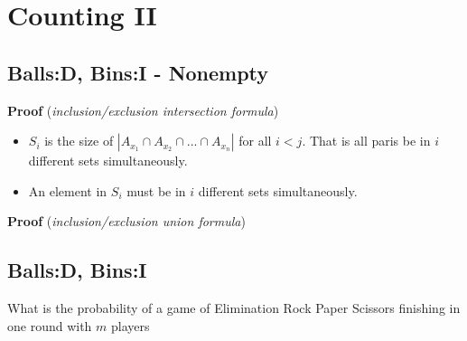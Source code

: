 
\chapter{Counting II}




\section{Balls:D, Bins:I - Nonempty}






\textbf{Proof} (\textit{inclusion/exclusion intersection formula})\\



\begin{itemize}
\item $S_i$ is the size of $|A_{x_1} \cap A_{x_2} \cap ... \cap A_{x_n}|$ for all $i < j$. 
That is all paris be in $i$ different sets simultaneously. 
\item An element in $S_i$ must be in $i$ different sets simultaneously. 
\end{itemize}


\frmrule

\textbf{Proof} (\textit{inclusion/exclusion union formula})\\



\frmrule


\section{Balls:D, Bins:I}






\begin{example}
What is the probability of a game of Elimination Rock Paper Scissors 
finishing in one round with $m$ players
\end{example}


